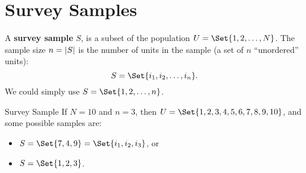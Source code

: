 \section*{Survey Samples}
\begin{Regular}{}
      A \textbf{survey sample} $S$, is a subset of the population
      $ U=\Set{1,2,\ldots,N} $.
      \tcblower{}
      The sample size $ n=\lvert S\rvert $ is the number
      of units in the sample (a set of $ n $ ``unordered'' units):
      \[ S=\Set{i_1,i_2,\ldots,i_n}. \]
      We could simply use $ S=\Set{1,2,\ldots,n} $.
\end{Regular}
\begin{Example}{Survey Sample}
      If $ N=10 $ and $n=3 $, then $U=\Set{1,2,3,4,5,6,7,8,9,10}$,
      and some possible samples are:
      \begin{itemize}
            \item $S=\Set{7,4,9}=\Set{i_1,i_2,i_3}$, or
            \item $S=\Set{1,2,3}$.
      \end{itemize}
\end{Example}
